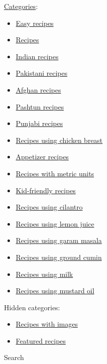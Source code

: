 \documentclass[11pt,a4paper]{article}
\begin{document}
\href{https://en.wikibooks.org/wiki/Special:Categories}{Categories}:

\begin{itemize}
\item \href{https://en.wikibooks.org/wiki/Category:Easy\_recipes}{Easy recipes}
\item \href{https://en.wikibooks.org/wiki/Category:Recipes}{Recipes}
\item \href{https://en.wikibooks.org/wiki/Category:Indian\_recipes}{Indian recipes}
\item \href{https://en.wikibooks.org/wiki/Category:Pakistani\_recipes}{Pakistani recipes}
\item \href{https://en.wikibooks.org/wiki/Category:Afghan\_recipes}{Afghan recipes}
\item \href{https://en.wikibooks.org/wiki/Category:Pashtun\_recipes}{Pashtun recipes}
\item \href{https://en.wikibooks.org/wiki/Category:Punjabi\_recipes}{Punjabi recipes}
\item \href{https://en.wikibooks.org/wiki/Category:Recipes\_using\_chicken\_breast}{Recipes using chicken breast}
\item \href{https://en.wikibooks.org/wiki/Category:Appetizer\_recipes}{Appetizer recipes}
\item \href{https://en.wikibooks.org/wiki/Category:Recipes\_with\_metric\_units}{Recipes with metric units}
\item \href{https://en.wikibooks.org/wiki/Category:Kid-friendly\_recipes}{Kid-friendly recipes}
\item \href{https://en.wikibooks.org/wiki/Category:Recipes\_using\_cilantro}{Recipes using cilantro}
\item \href{https://en.wikibooks.org/wiki/Category:Recipes\_using\_lemon\_juice}{Recipes using lemon juice}
\item \href{https://en.wikibooks.org/wiki/Category:Recipes\_using\_garam\_masala}{Recipes using garam masala}
\item \href{https://en.wikibooks.org/wiki/Category:Recipes\_using\_ground\_cumin}{Recipes using ground cumin}
\item \href{https://en.wikibooks.org/wiki/Category:Recipes\_using\_milk}{Recipes using milk}
\item \href{https://en.wikibooks.org/wiki/Category:Recipes\_using\_mustard\_oil}{Recipes using mustard oil}
\end{itemize}

Hidden categories:

\begin{itemize}
\item \href{https://en.wikibooks.org/wiki/Category:Recipes\_with\_images}{Recipes with images}
\item \href{https://en.wikibooks.org/wiki/Category:Featured\_recipes}{Featured recipes}
\end{itemize}

Search
\end{document}
